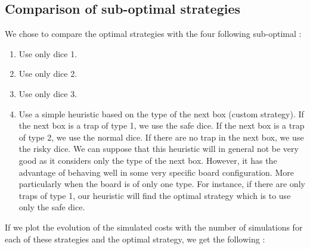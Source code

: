 \subsection{Comparison of sub-optimal strategies}
We chose to compare the optimal strategies with the four following sub-optimal :
\begin{enumerate}
	\item Use only dice 1.
	\item Use only dice 2.
	\item Use only dice 3.
	\item Use a simple heuristic based on the type of the next box (custom strategy).
	If the next box is a trap of type 1, we use the safe dice. 
	If the next box is a trap of type 2, we use the normal dice.
	If there are no trap in the next box, we use the risky dice. 
	We can suppose that this heuristic will in general not be very good as it considers only the type of the next box. 
	However, it has the advantage of behaving well in some very specific board configuration. 
	More particularly when the board is of only one type.
	For instance, if there are only traps of type 1, our heuristic will find the optimal strategy which is to use only the safe dice. 
\end{enumerate}

If we plot the evolution of the simulated costs with the number of simulations for each of these strategies and the optimal strategy, we get the following : 

